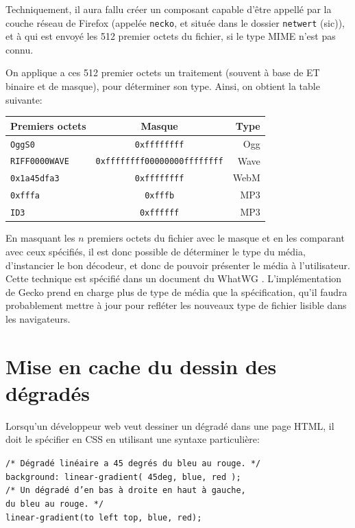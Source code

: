 \documentclass[a4paper,10pt]{article}
\newcommand{\cc}[1]{\texttt{#1}}
\begin{document}
\begin{multicols}{2}
    Techniquement, il aura fallu créer un composant capable d'être appellé par
    la couche réseau de Firefox (appelée \cc{necko}, et située dans le dossier
    \cc{netwert} (sic)), et à qui est envoyé les 512 premier octets du fichier,
    si le type MIME n'est pas connu.

    On applique a ces 512 premier octets un traitement  (souvent à base de ET
    binaire et de masque), pour déterminer son type. Ainsi, on obtient la table
    suivante:

    \begin{center}
      \begin{tabular}{ l | c | r }%
        Premiers octets & Masque                          & Type \\ \hline
             \cc{OggS0} & \cc{0xffffffff}                 & Ogg  \\
      \cc{RIFF0000WAVE} & \cc{0xffffffff00000000ffffffff} & Wave \\
        \cc{0x1a45dfa3} & \cc{0xffffffff}                 & WebM \\
            \cc{0xfffa} & \cc{0xfffb}                     & MP3  \\
               \cc{ID3} & \cc{0xffffff}                   & MP3  \\
      \end{tabular}
    \end{center}

    En masquant les $n$ premiers octets du fichier avec le masque et en les
    comparant avec ceux spécifiés, il est donc possible de déterminer le type du
    média, d'instancier le bon décodeur, et donc de pouvoir présenter le média à
    l'utilisateur. Cette technique est spécifié dans un document du WhatWG
    \cite{Sniff}. L'implémentation de Gecko prend en charge plus de type de
    média que la spécification, qu'il faudra probablement mettre à jour pour
    refléter les nouveaux type de fichier lisible dans les navigateurs.

  \section{Mise en cache du dessin des dégradés}

  Lorsqu'un développeur web veut dessiner un dégradé dans une page HTML, il doit
  le spécifier en CSS en utilisant une syntaxe particulière:

    \noindent
  {\footnotesize
  \cc{/* Dégradé linéaire a 45 degrés du bleu au rouge. */\\
    background: linear-gradient( 45deg, blue, red );\\
    /* Un dégradé d'en bas à droite en haut à gauche,\\
       du bleu au rouge. */\\
    linear-gradient(to left top, blue, red);\\
  }}


\end{multicols}
\end{document}
